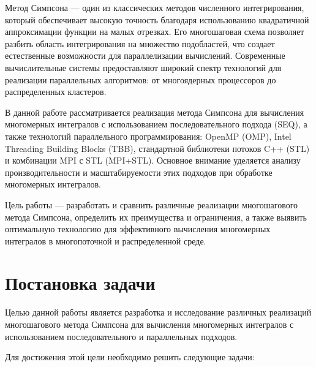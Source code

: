 \documentclass[12pt]{article}
\begin{document}
Метод Симпсона — один из классических методов численного интегрирования, который обеспечивает высокую точность благодаря использованию квадратичной аппроксимации функции на малых отрезках. Его многошаговая схема позволяет разбить область интегрирования на множество подобластей, что создает естественные возможности для параллелизации вычислений. Современные вычислительные системы предоставляют широкий спектр технологий для реализации параллельных алгоритмов: от многоядерных процессоров до распределенных кластеров.

В данной работе рассматривается реализация метода Симпсона для вычисления многомерных интегралов с использованием последовательного подхода (SEQ), а также технологий параллельного программирования: OpenMP (OMP), Intel Threading Building Blocks (TBB), стандартной библиотеки потоков C++ (STL) и комбинации MPI с STL (MPI+STL). Основное внимание уделяется анализу производительности и масштабируемости этих подходов при обработке многомерных интегралов.

Цель работы — разработать и сравнить различные реализации многошагового метода Симпсона, определить их преимущества и ограничения, а также выявить оптимальную технологию для эффективного вычисления многомерных интегралов в многопоточной и распределенной среде.

\section{Постановка задачи}

\hspace*{1.25em}Целью данной работы является разработка и исследование различных реализаций многошагового метода Симпсона для вычисления многомерных интегралов с использованием последовательного и параллельных подходов.

Для достижения этой цели необходимо решить следующие задачи:
\end{document}
